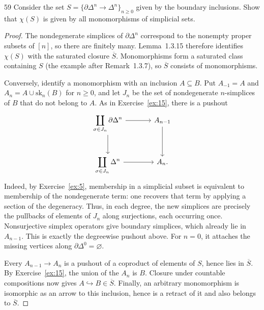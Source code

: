 \begin{exercise}{59}
Consider the set $S=\{\partial\Delta^n\to\Delta^n\}_{n\ge0}$ given by the boundary inclusions. Show
that $\chi(S)$ is given by all monomorphisms of simplicial sets.

\begin{proof}
The nondegenerate simplices of $\partial\Delta^n$ correspond
to the nonempty proper subsets of $[n]$, so there are finitely
many. Lemma~1.3.15 therefore identifies $\chi(S)$ with the
saturated closure $\overline S$.
Monomorphisms form a saturated class containing $S$
(the example after Remark~1.3.7), so
$\overline S$ consists of monomorphisms.

Conversely, identify a monomorphism with an inclusion $A\subseteq B$.
Put $A_{-1}=A$ and $A_n=A\cup\mathrm{sk}_n(B)$ for $n\ge0$,
and let $J_n$ be the set of nondegenerate $n$-simplices of $B$
that do not belong to $A$.
As in Exercise~\ref{ex:15}, there is a pushout
\[
 \begin{tikzcd}[column sep=large,row sep=large]
  \displaystyle\coprod_{\sigma\in J_n}\partial\Delta^n
    \arrow[r] \arrow[d] & A_{n-1}\arrow[d] \\
  \displaystyle\coprod_{\sigma\in J_n}\Delta^n
    \arrow[r] & A_n .
 \end{tikzcd}
\]
Indeed, by Exercise~\ref{ex:5}, membership in a simplicial
subset is equivalent to membership of the nondegenerate term:
one recovers that term by applying a section of the degeneracy.
Thus, in each degree, the new simplices are precisely the
pullbacks of elements of $J_n$ along surjections, each occurring
once. Nonsurjective simplex operators give boundary simplices,
which already lie in $A_{n-1}$.
This is exactly the degreewise pushout above.
For $n=0$, it attaches the missing vertices along
$\partial\Delta^0=\varnothing$.

Every $A_{n-1}\to A_n$ is a pushout of a coproduct of elements
of $S$, hence lies in $\overline S$.
By Exercise~\ref{ex:15}, the union of the $A_n$ is $B$.
Closure under countable compositions now gives
$A\hookrightarrow B\in\overline S$.
Finally, an arbitrary monomorphism is isomorphic as an arrow
to this inclusion, hence is a retract of it and also belongs
to $\overline S$.
\end{proof}
\end{exercise}
